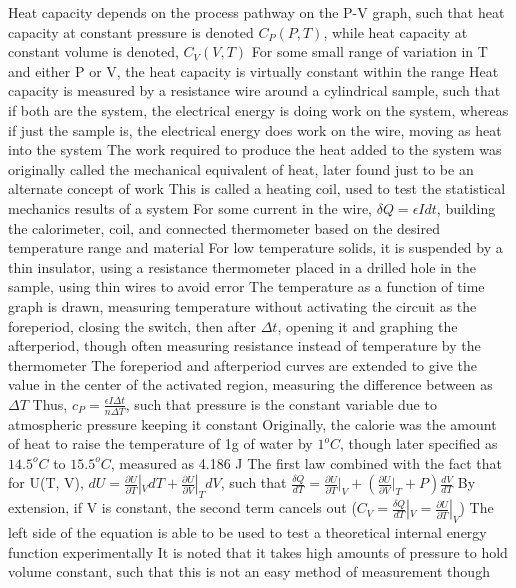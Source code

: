 \documentclass[11 pt, twoside]{article}
\newenvironment{outline*}
{
	\begin{outline}[enumerate]
	}
	{\end{outline}
}
\begin{document}
\begin{outline*}
\2 Heat capacity depends on the process pathway on the P-V graph, such that heat capacity at constant pressure is denoted $C_P(P, T)$, while heat capacity at constant volume is denoted, $C_V(V, T)$
\3 For some small range of variation in T and either P or V, the heat capacity is virtually constant within the range
\2 Heat capacity is measured by a resistance wire around a cylindrical sample, such that if both are the system, the electrical energy is doing work on the system, whereas if just the sample is, the electrical energy does work on the wire, moving as heat into the system
\3 The work required to produce the heat added to the system was originally called the mechanical equivalent of heat, later found just to be an alternate concept of work
\3 This is called a heating coil, used to test the statistical mechanics results of a system
\3 For some current in the wire, $\delta Q = \epsilon I dt$, building the calorimeter, coil, and connected thermometer based on the desired temperature range and material
\4 For low temperature  solids, it is suspended by a thin insulator, using a resistance thermometer placed in a drilled hole in the sample, using thin wires to avoid error
\3 The temperature as a function of time graph is drawn, measuring temperature without activating the circuit as the foreperiod, closing the switch, then after $\Delta t$, opening it and graphing the afterperiod, though often measuring resistance instead of temperature by the thermometer
\4 The foreperiod and afterperiod curves are extended to give the value in the center of the activated region, measuring the difference between as $\Delta T$
\4 Thus, $c_P = \frac{\epsilon I \Delta t}{n \Delta T}$, such that pressure is the constant variable due to atmospheric pressure keeping it constant
\2 Originally, the calorie was the amount of heat to raise the temperature of 1g of water by $1^o C$, though later specified as $14.5^o C$ to $15.5^o C$, measured as 4.186 J
\1 The first law combined with the fact that for U(T, V), $dU = \frac{\partial U}{\partial T}|_VdT + \frac{\partial U}{\partial V}|_TdV$, such that $\frac{\delta Q}{dT} = \frac{\partial U}{\partial T}|_V + (\frac{\partial U}{\partial V}|_T + P)\frac{dV}{dT}$
\2 By extension, if V is constant, the second term cancels out ($C_V = \frac{\delta Q}{dT}|_V = \frac{\partial U}{\partial T}|_V$)
\3 The left side of the equation is able to be used to test a theoretical internal energy function experimentally
\3 It is noted that it takes high amounts of pressure to hold volume constant, such that this is not an easy method of measurement though

\end{outline*}
\end{document}
